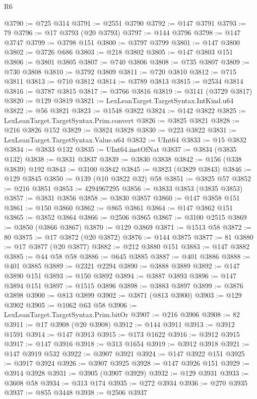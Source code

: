 \begin{lexlean}{R6}
\begin{coremodule}
@3790 := @725 @314
@3791 := @2551 @3790
@3792 := @147 @3791
@3793 := 79
@3796 := @17 @3793 (@20 @3793)
@3797 := @144 @3796
@3798 := @147 @3747
@3799 := @3798 @151
@3800 := @3797 @3799
@3801 := @147 @3800
@3802 := @3726 @686
@3803 := @218 @3802
@3805 := @147 @3803 @151
@3806 := @3801 @3805
@3807 := @740 @3806
@3808 := @735 @3807
@3809 := @730 @3808
@3810 := @3792 @3809
@3811 := @720 @3810
@3812 := @715 @3811
@3813 := @710 @3812
@3814 := @3789 @3813
@3815 := @2534 @3814
@3816 := @3787 @3815
@3817 := @3766 @3816
@3819 := @3141 (@3729 @3817)
@3820 := @129 @3819
@3821 := LexLeanTarget.TargetSyntax.IntKind.u64
@3822 := @56 @3821
@3823 := @1548 @3822
@3824 := @142 @3822
@3825 := LexLeanTarget.TargetSyntax.Prim.convert
@3826 := @3825 @3821
@3828 := @216 @3826 @152
@3829 := @3824 @3828
@3830 := @223 @3822
@3831 := LexLeanTarget.TargetSyntax.Value.u64
@3832 := UInt64
@3833 := @15 @3832
@3834 := @3833 @132
@3835 := UInt64.instOfNat
@3837 := @3834 (@3835 @132)
@3838 := @3831 @3837
@3839 := @3830 @3838
@3842 := @156 (@338 @3839) @192
@3843 := @3100 @3842
@3845 := @3823 (@3829 @3843)
@3846 := @129 @3845
@3850 := @139 (@10 @3822 @32) @58
@3851 := @3825 @57
@3852 := @216 @3851
@3853 := 4294967295
@3856 := @3833 @3853 (@3835 @3853)
@3857 := @3831 @3856
@3858 := @3830 @3857
@3860 := @147 @3858 @151
@3861 := @150 @3860
@3862 := @865 @3861
@3864 := @147 @3862 @151
@3865 := @3852 @3864
@3866 := @2506 @3865
@3867 := @3100 @2515
@3869 := @3850 (@3866 @3867)
@3870 := @129 @3869
@3871 := @1513 @58
@3872 := 80
@3875 := @17 @3872 (@20 @3872)
@3876 := @144 @3875
@3877 := 81
@3880 := @17 @3877 (@20 @3877)
@3882 := @212 @3880 @151
@3883 := @147 @3882
@3885 := @44 @58 @58
@3886 := @645 @3885
@3887 := @401 @3886
@3888 := @401 @3885
@3889 := @2321 @2294
@3890 := @3888 @3889
@3892 := @147 @3890 @151
@3893 := @150 @3892
@3894 := @3887 @3893
@3896 := @147 @3894 @151
@3897 := @1515 @3896
@3898 := @3883 @3897
@3899 := @3876 @3898
@3900 := @813 @3899
@3902 := @3871 (@813 @3900)
@3903 := @129 @3902
@3905 := @1062 @63 @58
@3906 := LexLeanTarget.TargetSyntax.Prim.bitOr
@3907 := @216 @3906
@3908 := 82
@3911 := @17 @3908 (@20 @3908)
@3912 := @144 @3911
@3913 := @3912 @1591
@3914 := @147 @3913
@3915 := @173 @1622
@3916 := @3912 @3915
@3917 := @147 @3916
@3918 := @313 @1654
@3919 := @3912 @3918
@3921 := @147 @3919 @532
@3922 := @3907 @3921
@3924 := @147 @3922 @151
@3925 := @3917 @3924
@3926 := @3907 @3925
@3928 := @147 @3926 @151
@3929 := @3914 @3928
@3931 := @3905 (@3907 @3929)
@3932 := @129 @3931
@3933 := @3608 @58
@3934 := @313 @174
@3935 := @272 @3934
@3936 := @270 @3935
@3937 := @855 @3448
@3938 := @2506 @3937

\end{coremodule}
\end{lexlean}
